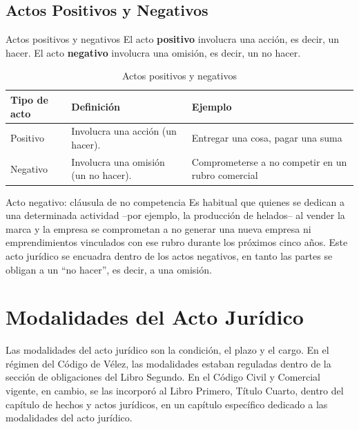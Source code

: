 \documentclass[12pt,oneside]{book}
\begin{document}

\section{Actos Positivos y Negativos}

\begin{definition}{Actos positivos y negativos}
El acto \textbf{positivo} involucra una acción, es decir, un hacer. El acto \textbf{negativo} involucra una omisión, es decir, un no hacer.
\end{definition}

\begin{table}[H]
\centering
\begin{tabularx}{\textwidth}{l X X}
\toprule
\textbf{Tipo de acto} & \textbf{Definición} & \textbf{Ejemplo} \\
\midrule
Positivo & Involucra una acción (un hacer). & Entregar una cosa, pagar una suma \\
Negativo & Involucra una omisión (un no hacer). & Comprometerse a no competir en un rubro comercial \\
\bottomrule
\end{tabularx}
\caption{Actos positivos y negativos}
\end{table}

\begin{example}{Acto negativo: cláusula de no competencia}
Es habitual que quienes se dedican a una determinada actividad --por ejemplo, la producción de helados-- al vender la marca y la empresa se comprometan a no generar una nueva empresa ni emprendimientos vinculados con ese rubro durante los próximos cinco años. Este acto jurídico se encuadra dentro de los actos negativos, en tanto las partes se obligan a un ``no hacer'', es decir, a una omisión.
\end{example}

\chapter{Modalidades del Acto Jurídico}

Las modalidades del acto jurídico son la condición, el plazo y el cargo. En el régimen del Código de Vélez, las modalidades estaban reguladas dentro de la sección de obligaciones del Libro Segundo. En el Código Civil y Comercial vigente, en cambio, se las incorporó al Libro Primero, Título Cuarto, dentro del capítulo de hechos y actos jurídicos, en un capítulo específico dedicado a las modalidades del acto jurídico.
\end{document}
